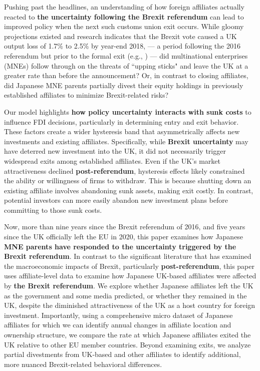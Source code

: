 \documentclass[preprint,11pt,authoryear]{elsarticle}
\begin{document}
Pushing past the headlines, an understanding of how foreign affiliates actually reacted to \textbf{the uncertainty following the Brexit referendum} can lead to improved policy when the next such customs union exit occurs. While gloomy projections existed and research indicates that the Brexit vote caused a UK output loss of 1.7\% to 2.5\% by year-end 2018, --- a period following the 2016 referendum but prior to the formal exit (e.g., \citealt{born2019}) --- did multinational enterprises (MNEs) follow through on the threats of ``upping sticks" and leave the UK at a greater rate than before the announcement? Or, in contrast to closing affiliates, did Japanese MNE parents partially divest their equity holdings in previously established affiliates to minimize Brexit-related risks? 

Our model highlights \textbf{how policy uncertainty interacts with sunk costs} to influence FDI decisions, particularly in determining entry and exit behavior. These factors create a wider hysteresis band that asymmetrically affects new investments and existing affiliates. Specifically, while \textbf{Brexit uncertainty} may have deterred new investment into the UK, it did not necessarily trigger widespread exits among established affiliates. Even if the UK’s market attractiveness declined \textbf{post-referendum}, hysteresis effects likely constrained the ability or willingness of firms to withdraw. This is because shutting down an existing affiliate involves abandoning sunk assets, making exit costly. In contrast, potential investors can more easily abandon new investment plans before committing to those sunk costs.


Now, more than nine years since the Brexit referendum of 2016, and five years since the UK officially left the EU in 2020, this paper examines how Japanese \textbf{MNE parents have responded to the uncertainty triggered by the Brexit referendum}. In contrast to the significant literature that has examined the macroeconomic impacts of Brexit, particularly \textbf{post-referendum}, this paper uses affiliate-level data to examine how Japanese UK-based affiliates were affected by \textbf{the Brexit referendum}. We explore whether Japanese affiliates left the UK as the government and some media predicted, or whether they remained in the UK, despite the diminished attractiveness of the UK as a host country for foreign investment.
Importantly, using a comprehensive micro dataset of Japanese affiliates for which we can identify annual changes in affiliate location and ownership structure, we compare the rate at which Japanese affiliates exited the UK relative to other EU member countries. Beyond examining exits, we analyze partial divestments from UK-based and other affiliates to identify additional, more nuanced Brexit-related behavioral differences.
\end{document}
